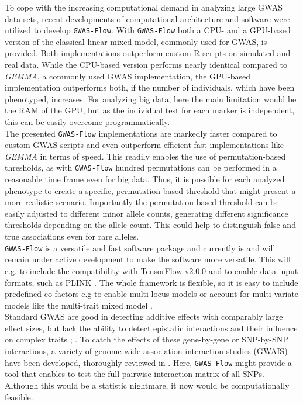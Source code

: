 To cope with the increasing computational demand in analyzing large GWAS data sets, recent
developments of computational architecture and software were utilized to develop
\texttt{GWAS-Flow}. With \texttt{GWAS-Flow} both a CPU- and a GPU-based version of the
classical linear mixed model, commonly used for GWAS, is provided. Both implementations
outperform custom R scripts on simulated and real data. While the CPU-based version
performs nearly identical compared to \textit{GEMMA}, a commonly used GWAS implementation,
the GPU-based implementation outperforms both, if the number of individuals, which have
been phenotyped, increases. For analyzing big data, here the main limitation would be the
RAM of the GPU, but as the individual test for each marker is
independent, this can be easily overcome programmatically. \\
The presented \texttt{GWAS-Flow} implementations are markedly faster compared to custom
GWAS scripts and even outperform efficient fast implementations like \textit{GEMMA} in
terms of speed. This readily enables the use of permutation-based thresholds, as with
\texttt{GWAS-Flow} hundred permutations can be performed in a reasonable time frame even
for big data. Thus, it is possible for each analyzed phenotype to create a specific,
permutation-based threshold that might present a more realistic scenario. Importantly the
permutation-based threshold can be easily adjusted to different minor allele counts,
generating different significance thresholds depending on the allele count. This could
help to distinguish false and true associations even for rare alleles.\\
\texttt{GWAS-Flow} is a versatile and fast software package and currently is and will
remain under active development to make the software more versatile. This will e.g. to
include the compatibility with TensorFlow v2.0.0 and to enable data input formats, such as
PLINK \cite{purcell2007plink}. The whole framework is flexible, so it is easy to include
predefined co-factors e.g to enable multi-locus models \cite{segura2012efficient} or
account for multi-variate models like the multi-trait mixed model
\cite{korte2012mixed}. \\
Standard GWAS are good in detecting additive effects with comparably large effect sizes,
but lack the ability to detect epistatic interactions and their influence on complex
traits \cite{mckinney2012six}; \cite{korte2013advantages}. To catch the effects of these
gene-by-gene or SNP-by-SNP interactions, a variety of genome-wide association interaction
studies (GWAIS) have been developed, thoroughly reviewed in \cite{ritchie2018GWAIS}. Here,
\texttt{GWAS-Flow} might provide a tool that enables to test the full pairwise interaction
matrix of all SNPs. Although this would be a statistic nightmare, it now would be
computationally feasible.


